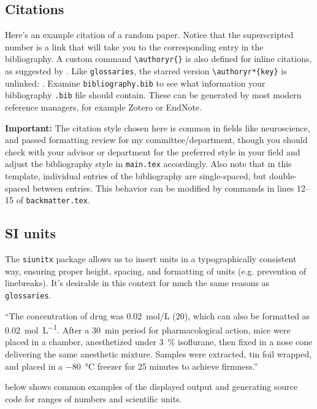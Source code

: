 \documentclass[../../main.tex]{subfiles}  %
\begin{document}
	\subsection{Citations}

	Here's an example citation of a random paper\supercite{aartsSolutionDependencyUsing2014}.
	Notice that the superscripted number is a link that will take you to the corresponding entry in the bibliography. 
	A custom command \verb|\authoryr{}| is also defined for inline citations, as suggested by .
	Like \texttt{glossaries}, the starred version \verb|\authoryr*{key}| is unlinked: . 
	Examine \texttt{bibliography.bib} to see what information your bibliography \texttt{.bib} file should contain.
	These can be generated by most modern reference managers, for example Zotero or EndNote.

	\begin{displayquote}
		\textbf{Important:} The citation style chosen here is common in fields like neuroscience, and passed formatting review for my committee/department, though you should check with your advisor or department for the preferred style in your field and adjust the bibliography style in \texttt{main.tex} accordingly.
		Also note that in this template, individual entries of the bibliography are single-spaced, but double-spaced between entries. 
		This behavior can be modified by commands in lines \numrange[range-phrase = --]{12}{15} of \texttt{backmatter.tex}. 
	\end{displayquote}

	\subsection{SI units}

	The \texttt{siunitx} package allows us to insert units in a typographically consistent way, ensuring proper height, spacing, and formatting of units (e.g. prevention of linebreaks).
	It's desirable in this context for much the same reasons as \texttt{glossaries}.
	\begin{displayquote}
		``The concentration of drug was \SI[per-mode=fraction]{0.02}{\mol/\L} (\SI{20}{\mM}), which can also be formatted as \SI[per-mode=fraction]{0.02}{\mol\per\L}.
		After a \SI{30}{\minute} period for pharmacological action, mice were placed in a chamber, anesthetized under \qty{3}{\percent} isoflurane, then fixed in a nose cone delivering the same anesthetic mixture. 
		Samples were extracted, tin foil wrapped, and placed in a \SI{-80}{\degreeCelsius} freezer for 25 minutes to achieve firmness.''
	\end{displayquote}

	 below shows common examples of the displayed output and generating source code for ranges of numbers and scientific units. 
	\\  %

	
\end{document}
